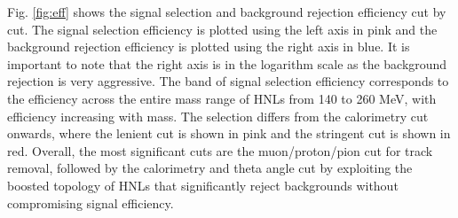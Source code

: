 Fig. \ref{fig:eff} shows the signal selection and background rejection efficiency cut by cut.
The signal selection efficiency is plotted using the left axis in pink and the background rejection efficiency is plotted using the right axis in blue.
It is important to note that the right axis is in the logarithm scale as the background rejection is very aggressive.
The band of signal selection efficiency corresponds to the efficiency across the entire mass range of HNLs from 140 to 260 MeV, with efficiency increasing with mass. 
The selection differs from the calorimetry cut onwards, where the lenient cut is shown in pink and the stringent cut is shown in red.
Overall, the most significant cuts are the muon/proton/pion cut for track removal, followed by the calorimetry and theta angle cut by exploiting the boosted topology of HNLs that significantly reject backgrounds without compromising signal efficiency.

